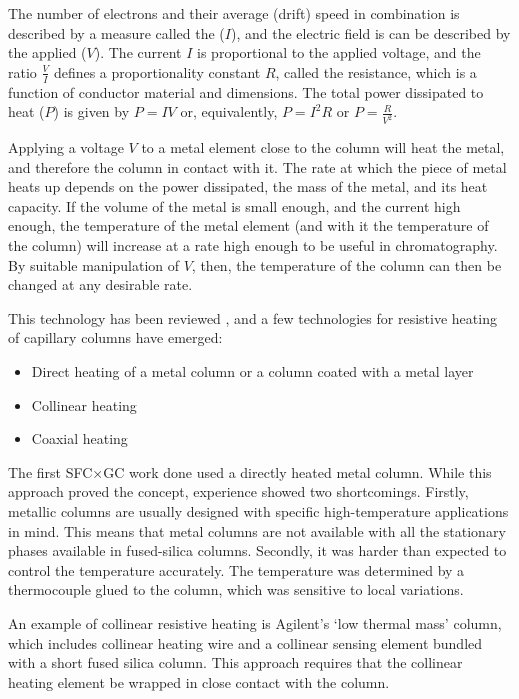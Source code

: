 The number of electrons and their average (drift) speed in combination is
described by a measure called the  ($I$), and the electric field
is can be described by the applied  ($V$). The current $I$ is
proportional to the applied voltage, and the ratio $\frac{V}{I}$ defines a
proportionality constant $R$, called the resistance, which is a function of
conductor material and dimensions. The total power dissipated to heat ($P$) is
given by $P=IV$ or, equivalently, $P=I^2R$ or $P=\frac{R}{V^2}$.

Applying a voltage \(V\) to a metal element close to the column will heat the
metal, and therefore the column in contact with it. The rate at which the piece
of metal heats up depends on the power dissipated, the mass of the metal, and
its heat capacity. If the volume of the metal is small enough, and the current
high enough, the temperature of the metal element (and with it the temperature
of the column) will increase at a rate high enough to be useful in
chromatography. By suitable manipulation of \(V\), then, the temperature of the
column can then be changed at any desirable rate.

This technology has been reviewed \autocite{Wang2012, Jacobs2013, Miranda2010},
and a few technologies for resistive heating of capillary columns have emerged:

\begin{itemize}
  \item Direct heating of a metal column or a column coated with a metal layer
  \item Collinear heating
  \item Coaxial heating
\end{itemize}

The first SFC×GC work done \autocite{Venter2004} used a directly heated metal
column. While this approach proved the concept, experience showed two
shortcomings. Firstly, metallic columns are usually designed with specific
high-temperature applications in mind. This means that metal columns are not
available with all the stationary phases available in fused-silica columns.
Secondly, it was harder than expected to control the temperature accurately. The
temperature was determined by a thermocouple glued to the column, which was
sensitive to local variations.

An example of collinear resistive heating is Agilent\texttrademark{}'s
`low thermal mass' column, which includes collinear heating wire and a collinear
sensing element bundled with a short fused silica column. This approach requires that
the collinear heating element be wrapped in close contact with the column.

